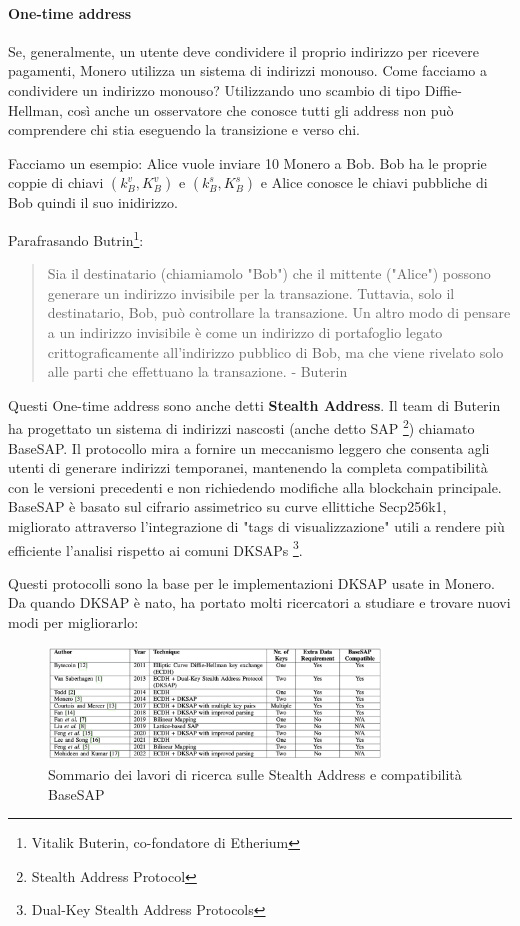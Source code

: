 \documentclass[12pt,a4paper]{article}
\begin{document}
\paragraph{One-time address}
Se, generalmente, un utente deve condividere il proprio indirizzo per ricevere
pagamenti, Monero utilizza un sistema di indirizzi monouso. Come facciamo a
condividere un indirizzo monouso? Utilizzando uno scambio di tipo
Diffie-Hellman, così anche un osservatore che conosce tutti gli address non può
comprendere chi stia eseguendo la transizione e verso chi.

Facciamo un esempio: Alice vuole inviare 10 Monero a Bob. Bob ha le proprie
coppie di chiavi $(k^v_B, K^v_B)$ e $(k^s_B, K^s_B)$ e Alice conosce le chiavi
pubbliche di Bob quindi il suo inidirizzo.

Parafrasando Butrin\footnote{Vitalik Buterin, co-fondatore di Etherium}:
\begin{quote}
    Sia il destinatario (chiamiamolo "Bob") che il mittente ("Alice") possono
    generare un indirizzo invisibile per la transazione. Tuttavia, solo il
    destinatario, Bob, può controllare la transazione. Un altro modo di pensare
    a un indirizzo invisibile è come un indirizzo di portafoglio legato
    crittograficamente all’indirizzo pubblico di Bob, ma che viene rivelato solo
    alle parti che effettuano la transazione. - Buterin \cite{Buterin Quote}
\end{quote}

Questi One-time address sono anche detti \textbf{Stealth Address}. Il team di
Buterin ha progettato un sistema di indirizzi nascosti (anche detto SAP
\footnote{Stealth Address Protocol}) chiamato BaseSAP. Il protocollo mira a
fornire un meccanismo leggero che consenta agli utenti di generare indirizzi
temporanei, mantenendo la completa compatibilità con le versioni precedenti e
non richiedendo modifiche alla blockchain principale. BaseSAP è basato sul
cifrario assimetrico su curve ellittiche Secp256k1, migliorato attraverso
l'integrazione di "tags di visualizzazione" utili a rendere più efficiente
l'analisi rispetto ai comuni DKSAPs \footnote{Dual-Key Stealth Address
Protocols}.

Questi protocolli sono la base per le implementazioni DKSAP usate in Monero. Da
quando DKSAP è nato, ha portato molti ricercatori a studiare e trovare nuovi
modi per migliorarlo:

\begin{figure}[ht]
    \centering
    \includegraphics[width=0.79\textwidth]{./images/sommario.png}
    \caption{Sommario dei lavori di ricerca sulle Stealth Address e compatibilità BaseSAP}
    \label{fig:summary}
\end{figure}
\end{document}
